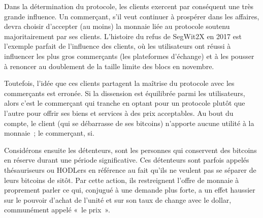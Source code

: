 Dans la détermination du protocole, les clients exercent par conséquent une très grande influence. Un commerçant, s'il veut continuer à prospérer dans les affaires, devra choisir d'accepter (au moins) la monnaie liée au protocole soutenu majoritairement par ses clients. L'histoire du refus de SegWit2X en 2017 est l'exemple parfait de l'influence des clients, où les utilisateurs ont réussi à influencer les plus gros commerçants (les plateformes d'échange) et à les pousser à renoncer au doublement de la taille limite des blocs en novembre.

Toutefois, l'idée que ces clients partagent la maîtrise du protocole avec les commerçants est erronée. Si la dissension est équilibrée parmi les utilisateurs, alors c'est le commerçant qui tranche en optant pour un protocole plutôt que l'autre pour offrir ses biens et services à des prix acceptables. Au bout du compte, le client (qui se débarrasse de ses bitcoins) n'apporte aucune utilité à la monnaie~; le commerçant, si.


Considérons ensuite les détenteurs, sont les personnes qui conservent des bitcoins en réserve durant une période significative. Ces détenteurs sont parfois appelés thésauriseurs ou HODLers en référence au fait qu'ils ne veulent pas se séparer de leurs bitcoins de sitôt. Par cette action, ils restreignent l'offre de monnaie à proprement parler ce qui, conjugué à une demande plus forte, a un effet haussier sur le pouvoir d'achat de l'unité et sur son taux de change avec le dollar, communément appelé «~le prix~».

